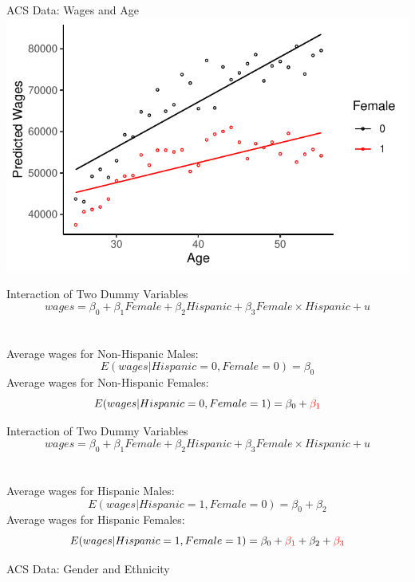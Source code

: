 \documentclass{./../div_teaching_slides}
\begin{document}
\begin{frame}{ACS Data: Wages and Age}
\vspace{-.5em}
\centering \small
\includegraphics{./../../output/fit_gender_age_inter.pdf} \\ \vspace{1.5em}
\end{frame}

\begin{frame}{Interaction of Two Dummy Variables}
\vspace{-1em}
$$ wages = \beta_0 + \beta_1 Female + \beta_2 Hispanic + \beta_3 Female \times Hispanic +  u  $$ \\~\\
Average wages for Non-Hispanic Males:
$$ E(wages|Hispanic=0, Female=0) = \beta_0  $$ 
Average wages for Non-Hispanic Females:
$$ E(wages|Hispanic=0, Female=1) = \beta_0 + \textcolor{red}{\beta_1}  $$
\end{frame}

\begin{frame}{Interaction of Two Dummy Variables}
\vspace{-1em}
$$ wages = \beta_0 + \beta_1 Female + \beta_2 Hispanic + \beta_3 Female \times Hispanic +  u  $$ \\~\\
Average wages for Hispanic Males:
$$ E(wages|Hispanic=1, Female=0) = \beta_0 + \beta_2  $$ 
Average wages for Hispanic Females:
$$ E(wages|Hispanic=1, Female=1) = \beta_0 + \textcolor{red}{\beta_1} + \beta_2 + \textcolor{red}{\beta_3}  $$
\end{frame}

\begin{frame}{ACS Data: Gender and Ethnicity}
\centering  \small  
 \\ \vspace{1.5em}
\end{frame}
\end{document}
